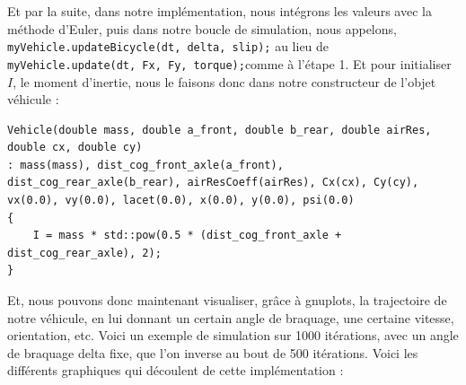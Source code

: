 Et par la suite, dans notre implémentation, nous intégrons les valeurs avec la méthode d'Euler, puis dans notre boucle de simulation, nous appelons, \texttt{myVehicle.updateBicycle(dt, delta, slip);} au lieu de \texttt{myVehicle.update(dt, Fx, Fy, torque);}comme à l'étape 1. Et pour initialiser $I$, le moment d'inertie, nous le faisons donc dans notre constructeur de l'objet véhicule :

\begin{lstlisting}[style=CStyle,label={lst:constructor_vehicle_1}]
Vehicle(double mass, double a_front, double b_rear, double airRes, double cx, double cy)
: mass(mass), dist_cog_front_axle(a_front), dist_cog_rear_axle(b_rear), airResCoeff(airRes), Cx(cx), Cy(cy), vx(0.0), vy(0.0), lacet(0.0), x(0.0), y(0.0), psi(0.0)
{
    I = mass * std::pow(0.5 * (dist_cog_front_axle + dist_cog_rear_axle), 2);
}
\end{lstlisting}

Et, nous pouvons donc maintenant visualiser, grâce à \glspl{gnuplot}, la trajectoire de notre véhicule, en lui donnant un certain angle de braquage, une certaine vitesse, orientation, etc. Voici un exemple de simulation sur 1000 itérations, avec un angle de braquage delta fixe, que l'on inverse au bout de 500 itérations.
Voici les différents graphiques qui découlent de cette implémentation :

